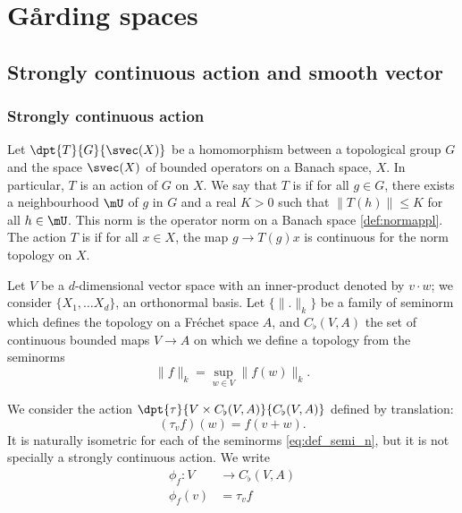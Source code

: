 %
   \section{G\r arding spaces}
%

\subsection{Strongly continuous action and smooth vector}  \label{subsec:actionrn}

\subsubsection{Strongly continuous action}

Let $\dpt{T}{G}{\svec(X)}$ be a homomorphism between a topological group $G$ and the space $\svec(X)$ of bounded operators on a Banach space, $X$. In particular, $T$ is an action of $G$ on $X$. We say that $T$ is  if for all $g\in G$, there exists a neighbourhood $\mU$ of $g$ in $G$ and a real $K>0$ such that $\| T(h) \|\leq K$ for all $h\in\mU$. This norm is the operator norm on a Banach space \ref{def:normappl}. The action $T$ is  if for all $x\in X$, the map $g\to T(g)x$ is continuous for the norm topology on $X$.

Let $V$ be a $d$-dimensional vector space with an inner-product denoted by $v\cdot w$; we consider $\{ X_1,\ldots X_d \}$, an orthonormal basis. Let $\{\| . \|_k\}$ be a family of seminorm which defines the topology on a Fréchet space $A$, and $C_{\flat}(V,A)$  the set of continuous bounded maps $V\to A$ on which we define a topology from the seminorms
\begin{equation} \label{eq:def_semi_n}
  \| f \|_k=\sup_{w\in V}\| f(w) \|_k.
\end{equation}

We consider the action $\dpt{\tau}{V\times C_{\flat}(V,A)}{C_{\flat}(V,A)}$ defined by translation:
\begin{equation} \label{eq:def_act_tau}
(\tau_vf)(w)=f(v+w).
\end{equation}
It is naturally isometric for each of the seminorms \eqref{eq:def_semi_n}, but it is not specially a strongly continuous action. We write 
\begin{equation}
	\begin{aligned}
		\phi_f\colon V&\to C_{\flat}(V,A) \\
		\phi_f(v)&=\tau_vf 
	\end{aligned}
\end{equation}

